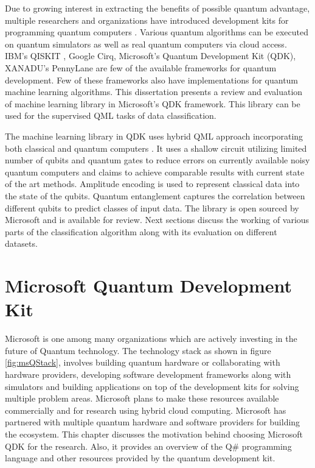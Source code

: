 \documentclass[english,a4paper,11pt,oneside,onecolumn]{book}
\begin{document}
Due to growing interest in extracting the benefits of possible quantum advantage, multiple researchers and organizations have introduced development kits for programming quantum computers \cite{asfaw_2020_learn, cjgronlund_microsoft}. Various quantum algorithms can be executed on quantum simulators as well as real quantum computers via cloud access. IBM's QISKIT \cite{asfaw_2020_learn}, Google Cirq, Microsoft's Quantum Development Kit (QDK), XANADU's PennyLane are few of the available frameworks for quantum development. Few of these frameworks also have implementations for quantum machine learning algorithms. This dissertation presents a review and evaluation of machine learning library in Microsoft's QDK framework. This library can be used for the supervised QML tasks of data classification.\par
The machine learning library in QDK uses hybrid QML approach incorporating both classical and quantum computers \cite{schuld_2020_circuitcentric}. It uses a shallow circuit utilizing limited number of qubits and quantum gates to reduce errors on currently available noisy quantum computers and claims to achieve comparable results with current state of the art methods. Amplitude encoding is used to represent classical data into the state of the qubits. Quantum entanglement captures the correlation between different qubits to predict classes of input data. The library is open sourced by Microsoft and is available for review. Next sections discuss the working of various parts of the classification algorithm along with its evaluation on different datasets.\par 

\chapter{Microsoft Quantum Development Kit}
\label{sec:MSFTQDK}
Microsoft is one among many organizations which are actively investing in the future of Quantum technology. The technology stack \cite{cjgronlund_microsoft} as shown in figure \ref{fig:msQStack}, involves building quantum hardware or collaborating with hardware providers, developing software development frameworks along with simulators and building applications on top of the development kits for solving multiple problem areas. Microsoft plans to make these resources available commercially and for research using hybrid cloud computing. Microsoft has partnered with multiple quantum hardware and software providers for building the ecosystem. This chapter discusses the motivation behind choosing Microsoft QDK for the research. Also, it provides an overview of the Q\# programming language and other resources provided by the quantum development kit.
\end{document}
